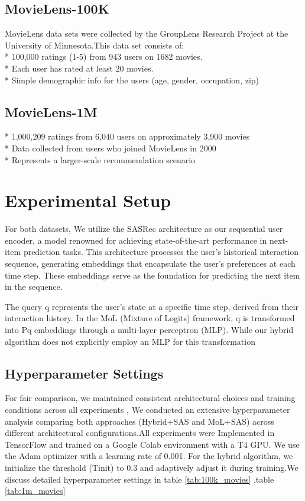 \subsection{MovieLens-100K}
MovieLens data sets were collected by the GroupLens Research Project
at the University of Minnesota.This data set consists of:\\
* 100,000 ratings (1-5) from 943 users on 1682 movies. \\
* Each user has rated at least 20 movies. \\
* Simple demographic info for the users (age, gender, occupation, zip)
\subsection{MovieLens-1M}
* 1,000,209 ratings from 6,040 users on approximately 3,900 movies \\
* Data collected from users who joined MovieLens in 2000 \\
* Represents a larger-scale recommendation scenario \\
\section{Experimental Setup}
For both datasets, We utilize the SASRec architecture as our sequential user encoder, a model renowned for achieving state-of-the-art performance in next-item prediction tasks. This architecture processes the user's historical interaction sequence, generating embeddings that encapsulate the user's preferences at each time step. These embeddings serve as the foundation for predicting the next item in the sequence.

The query q represents the user's state at a specific time step, derived from their interaction history. In the MoL (Mixture of Logits) framework, q is transformed into Pq
embeddings through a multi-layer perceptron (MLP). While our hybrid algorithm does not explicitly employ an MLP for this transformation
\subsection{Hyperparameter Settings}
For fair comparison, we maintained consistent architectural choices and training conditions across all experiments , We conducted an extensive hyperparameter analysis comparing both approaches (Hybrid+SAS and MoL+SAS) across different architectural configurations.All experiments were Implemented in TensorFlow and trained on a Google Colab environment with a T4 GPU. We use the Adam optimizer with a learning rate of 0.001. For the hybrid algorithm, we initialize the threshold (Tinit) to 0.3 and adaptively adjust it during training.We discuss detailed hyperparameter settings in table \ref{tab:100k_movies} ,table \ref{tab:1m_movies}

